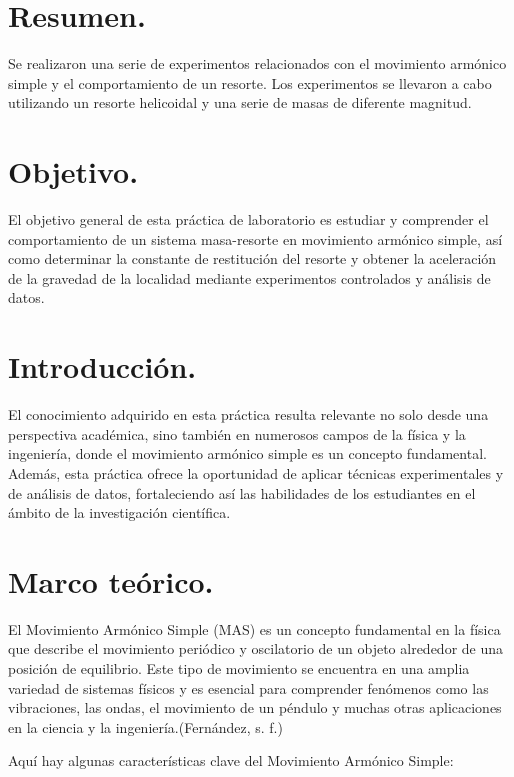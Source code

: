 \documentclass[10pt]{article}
\begin{document}
\tableofcontents
\newpage

\section{Resumen.}
Se realizaron una serie de experimentos relacionados con el movimiento armónico simple y el comportamiento de un resorte. Los experimentos se llevaron a cabo utilizando un resorte helicoidal y una serie de masas de diferente magnitud.  

\begin{multicols}{2}

\section{Objetivo.}
El objetivo general de esta práctica de laboratorio es estudiar y comprender el comportamiento de un sistema masa-resorte en movimiento armónico simple, así como determinar la constante de restitución del resorte y obtener la aceleración de la gravedad de la localidad mediante experimentos controlados y análisis de datos.
\section{Introducción.}

El conocimiento adquirido en esta práctica resulta relevante no solo desde una perspectiva académica, sino también en numerosos campos de la física y la ingeniería, donde el movimiento armónico simple es un concepto fundamental. Además, esta práctica ofrece la oportunidad de aplicar técnicas experimentales y de análisis de datos, fortaleciendo así las habilidades de los estudiantes en el ámbito de la investigación científica.


\section{Marco teórico.}
El Movimiento Armónico Simple (MAS) es un concepto fundamental en la física que describe el movimiento periódico y oscilatorio de un objeto alrededor de una posición de equilibrio. Este tipo de movimiento se encuentra en una amplia variedad de sistemas físicos y es esencial para comprender fenómenos como las vibraciones, las ondas, el movimiento de un péndulo y muchas otras aplicaciones en la ciencia y la ingeniería.(Fernández, s. f.)

Aquí hay algunas características clave del Movimiento Armónico Simple:


\end{multicols}
\end{document}
